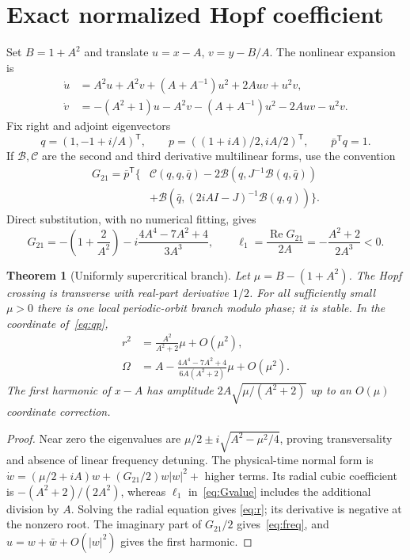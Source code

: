 \documentclass[10pt]{article}
\newtheorem{theorem}{Theorem}
\newcommand{\Rea}{\operatorname{Re}}
\begin{document}
\section{Exact normalized Hopf coefficient}
Set $B=1+A^2$ and translate $u=x-A$, $v=y-B/A$.  The nonlinear expansion is
\begin{align*}
 \dot u&=A^2u+A^2v+(A+A^{-1})u^2+2Auv+u^2v,\\
 \dot v&=-(A^2+1)u-A^2v-(A+A^{-1})u^2-2Auv-u^2v.
\end{align*}
Fix right and adjoint eigenvectors
\begin{equation}\label{eq:qp}
 q=(1,-1+i/A)^{\mathsf T},\qquad
 p=((1+iA)/2,iA/2)^{\mathsf T},\qquad \bar p^{\mathsf T}q=1.
\end{equation}
If $\mathcal B,\mathcal C$ are the second and third derivative multilinear
forms, use the convention
\begin{align}\label{eq:G}
G_{21}=\bar p^{\mathsf T}\{&\mathcal C(q,q,\bar q)
-2\mathcal B(q,J^{-1}\mathcal B(q,\bar q))\\
&+\mathcal B(\bar q,(2iA I-J)^{-1}\mathcal B(q,q))\}.
\end{align}
Direct substitution, with no numerical fitting, gives
\begin{equation}\label{eq:Gvalue}
 G_{21}=-\left(1+\frac2{A^2}\right)
 -i\frac{4A^4-7A^2+4}{3A^3},\qquad
 \ell_1=\frac{\Rea G_{21}}{2A}=-\frac{A^2+2}{2A^3}<0.
\end{equation}

\begin{theorem}[Uniformly supercritical branch]\label{thm:hopf}
Let $\mu=B-(1+A^2)$.  The Hopf crossing is transverse with real-part
derivative $1/2$.  For all sufficiently small $\mu>0$ there is one local
periodic-orbit branch modulo phase; it is stable.  In the coordinate
of~\eqref{eq:qp},
\begin{align}
 r^2&=\frac{A^2}{A^2+2}\mu+O(\mu^2),\label{eq:r}\\
 \Omega&=A-\frac{4A^4-7A^2+4}{6A(A^2+2)}\mu+O(\mu^2).\label{eq:freq}
\end{align}
The first harmonic of $x-A$ has amplitude
$2A\sqrt{\mu/(A^2+2)}$ up to an $O(\mu)$ coordinate correction.
\end{theorem}
\begin{proof}
Near zero the eigenvalues are
$\mu/2\pm i\sqrt{A^2-\mu^2/4}$, proving transversality and absence of linear
frequency detuning.  The physical-time normal form is
$\dot w=(\mu/2+iA)w+(G_{21}/2)w|w|^2+$ higher terms.  Its radial cubic
coefficient is $-(A^2+2)/(2A^2)$, whereas $\ell_1$ in~\eqref{eq:Gvalue}
includes the additional division by $A$.  Solving the radial equation gives
\eqref{eq:r}; its derivative is negative at the nonzero root.  The imaginary
part of $G_{21}/2$ gives~\eqref{eq:freq}, and $u=w+\bar w+O(|w|^2)$ gives the
first harmonic.
\end{proof}
\end{document}
